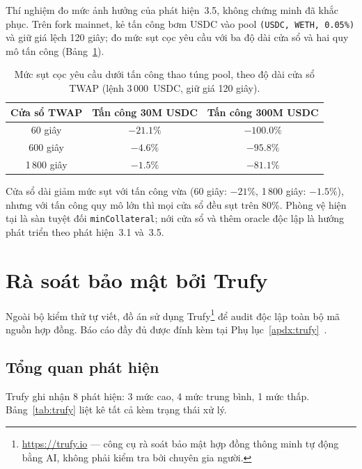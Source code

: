 \documentclass[../DoAn.tex]{subfiles}
\begin{document}
Thí nghiệm đo mức ảnh hưởng của phát hiện~3.5, không chứng minh đã khắc phục. Trên fork mainnet, kẻ tấn công bơm USDC vào pool \texttt{(USDC, WETH, 0.05\%)} và giữ giá lệch 120 giây; đo mức sụt cọc yêu cầu với ba độ dài cửa sổ và hai quy mô tấn công (Bảng~\ref{tab:twap}).

\begin{table}[H]
\centering
\caption{Mức sụt cọc yêu cầu dưới tấn công thao túng pool, theo độ dài cửa sổ TWAP (lệnh 3\,000~USDC, giữ giá 120 giây).}
\label{tab:twap}
\begin{tabular}{|c|c|c|}
\hline
\textbf{Cửa sổ TWAP} & \textbf{Tấn công 30M USDC} & \textbf{Tấn công 300M USDC} \\
\hline
60 giây   & $-21.1\%$ & $-100.0\%$ \\
\hline
600 giây  & $-4.6\%$  & $-95.8\%$ \\
\hline
1\,800 giây & $-1.5\%$  & $-81.1\%$ \\
\hline
\end{tabular}
\end{table}

Cửa sổ dài giảm mức sụt với tấn công vừa (60 giây: $-21\%$, 1\,800 giây: $-1.5\%$), nhưng với tấn công quy mô lớn thì mọi cửa sổ đều sụt trên 80\%. Phòng vệ hiện tại là sàn tuyệt đối \texttt{minCollateral}; nới cửa sổ và thêm oracle độc lập là hướng phát triển theo phát hiện~3.1 và~3.5.

\section{Rà soát bảo mật bởi Trufy}
\label{sec:audit}

Ngoài bộ kiểm thử tự viết, đồ án sử dụng Trufy\footnote{\url{https://trufy.io} --- công cụ rà soát bảo mật hợp đồng thông minh tự động bằng AI, không phải kiểm tra bởi chuyên gia người.} để audit độc lập toàn bộ mã nguồn hợp đồng. Báo cáo đầy đủ được đính kèm tại Phụ lục~\ref{apdx:trufy}~\cite{trufy2026}.

\subsection{Tổng quan phát hiện}

Trufy ghi nhận 8 phát hiện: 3 mức cao, 4 mức trung bình, 1 mức thấp. Bảng~\ref{tab:trufy} liệt kê tất cả kèm trạng thái xử lý.
\end{document}
